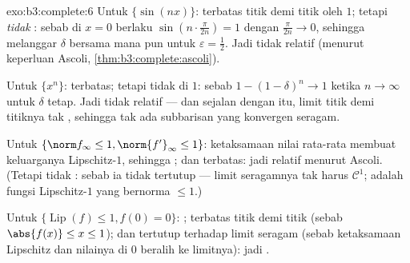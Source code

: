 \begin{solution}{exo:b3:complete:6}
Untuk $\{\sin(nx)\}$: terbatas titik demi titik oleh $1$; tetapi \emph{tidak}
: sebab di $x = 0$ berlaku $\sin(n\cdot\frac{\pi}{2n}) = 1$
dengan $\frac\pi{2n} \to 0$, sehingga melanggar $\delta$ bersama mana pun untuk
$\varepsilon = \frac12$. Jadi tidak  relatif (menurut keperluan Ascoli,
\cref{thm:b3:complete:ascoli}).

Untuk $\{x^n\}$: terbatas; tetapi tidak  di $1$: sebab $1 - (1 -
\delta)^n \to 1$ ketika $n \to \infty$ untuk $\delta$ tetap. Jadi tidak
 relatif --- dan sejalan dengan itu, limit titik demi titiknya
tak , sehingga tak ada subbarisan yang konvergen seragam.

Untuk $\{\norm f_\infty \leq 1, \norm{f'}_\infty \leq 1\}$: ketaksamaan
nilai rata-rata membuat keluarganya Lipschitz-$1$, sehingga
; dan terbatas: jadi  relatif menurut Ascoli. (Tetapi tidak
: sebab ia tidak tertutup --- limit seragamnya tak harus
$\mathcal C^1$;  adalah fungsi Lipschitz-$1$ yang
bernorma $\leq 1$.)

Untuk $\{\operatorname{Lip}(f) \leq 1, f(0) = 0\}$: ;
terbatas titik demi titik (sebab $\abs{f(x)} \leq x \leq 1$); dan tertutup
terhadap limit seragam (sebab ketaksamaan Lipschitz dan nilainya di
$0$ beralih ke limitnya): jadi .
\end{solution}


